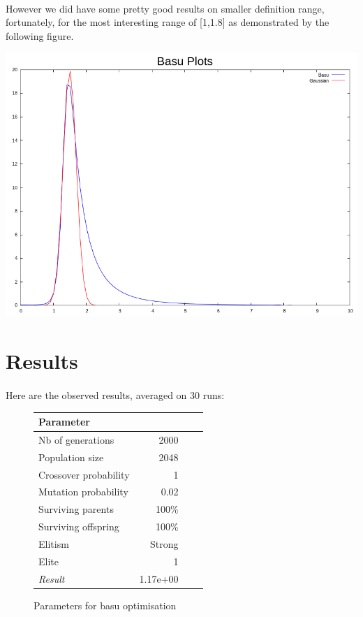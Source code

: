\documentclass{article}
\begin{document}
    \paragraph{} %
    \label{par:}
      However we did have some pretty good results on smaller definition range,
      fortunately, for the most interesting range of [1,1.8] as demonstrated by the
      following figure.

    \includegraphics[scale=0.3]{basu_best}
    
   
   \section{Results} %
   \label{sec:Result}
   \paragraph{} %
   
     \label{par:}
       Here are the observed results, averaged on 30 runs:
    
    \begin{figure}
    \begin{small} 
    \begin{tabular}{lrrr}
      Parameter &  \\
      \hline
      Nb of generations & 2000 \\
      Population size & 2048  \\
      Crossover probability & 1 \\
      Mutation probability & 0.02\\
      Surviving parents & 100\%  \\
      Surviving offspring & 100\% \\
      Elitism & Strong \\
      Elite & 1 \\ \hline
      \emph{Result} & 1.17e+00 \\
      \hline 
      \end{tabular}
      \caption{Parameters for basu optimisation}
    \end{small}
    \end{figure}
\end{document}
